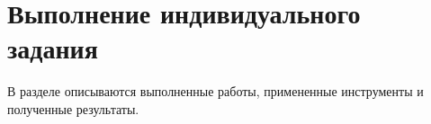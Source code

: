\section{Выполнение индивидуального задания}

В разделе описываются выполненные работы, примененные инструменты и полученные результаты.
